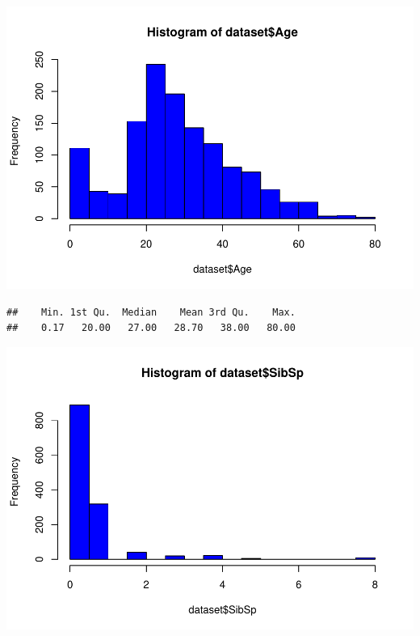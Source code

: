 \documentclass[
]{article}
\newenvironment{Shaded}{\begin{snugshade}}{\end{snugshade}}
\newcommand{\AttributeTok}[1]{\textcolor[rgb]{0.80,0.80,0.80}{#1}}
\newcommand{\CommentTok}[1]{\textcolor[rgb]{0.50,0.62,0.50}{#1}}
\newcommand{\FunctionTok}[1]{\textcolor[rgb]{0.94,0.94,0.56}{#1}}
\newcommand{\NormalTok}[1]{\textcolor[rgb]{0.80,0.80,0.80}{#1}}
\newcommand{\SpecialCharTok}[1]{\textcolor[rgb]{0.86,0.64,0.64}{#1}}
\newcommand{\StringTok}[1]{\textcolor[rgb]{0.80,0.58,0.58}{#1}}
\begin{document}
\includegraphics{titanic-analysis_files/figure-latex/unnamed-chunk-14-3.pdf}

\begin{Shaded}
\end{Shaded}

\begin{verbatim}
##    Min. 1st Qu.  Median    Mean 3rd Qu.    Max. 
##    0.17   20.00   27.00   28.70   38.00   80.00
\end{verbatim}

\begin{Shaded}
\end{Shaded}

\includegraphics{titanic-analysis_files/figure-latex/unnamed-chunk-14-4.pdf}
\end{document}

